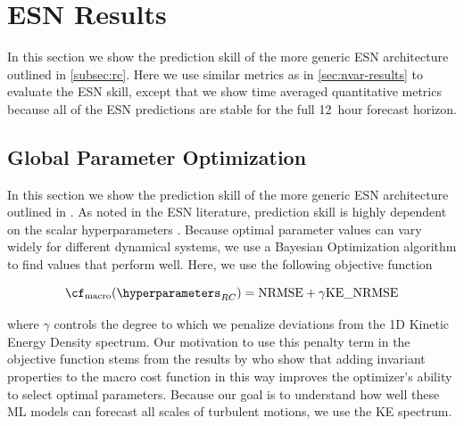 \section{ESN Results}
\label{sec:esn-results}

In this section we show the prediction skill of the more generic ESN
architecture outlined in \cref{subsec:rc}.
Here we use similar metrics as in \cref{sec:nvar-results} to evaluate the ESN
skill, except that we show time averaged quantitative metrics because all of the
ESN predictions are stable for the full 12~hour forecast horizon.

\subsection{Global Parameter Optimization}
\label{subsec:esn-ego}

In this section we show the prediction skill of the more generic ESN
architecture outlined in .
As noted in the ESN literature, prediction skill is highly dependent on the
scalar hyperparameters .
Because optimal parameter values can vary widely for different dynamical
systems, we use a Bayesian Optimization algorithm to find values that perform
well.
Here, we use the following objective function
\begin{linenomath*}\begin{equation}
    \cf_\text{macro}(\hyperparameters_{RC}) =
    \text{NRMSE} + \gamma \text{KE\_NRMSE}
\end{equation}\end{linenomath*}
where $\gamma$ controls the degree to which we penalize deviations from the 1D
Kinetic Energy Density spectrum.
Our motivation to use this penalty term in the objective function stems from the
results by  who show that adding invariant properties to the
macro cost function in this way improves the optimizer's ability to
select optimal parameters.
Because our goal is to understand how well these ML models can forecast
all scales of turbulent motions, we use the KE spectrum.

